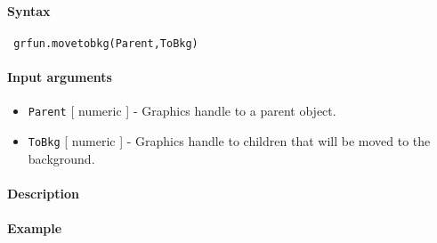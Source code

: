 


	\paragraph{Syntax}
 
 \begin{verbatim}
 grfun.movetobkg(Parent,ToBkg)
 \end{verbatim}
 
 \paragraph{Input arguments}
 
 \begin{itemize}
 \item
   \texttt{Parent} {[} numeric {]} - Graphics handle to a parent object.
 \item
   \texttt{ToBkg} {[} numeric {]} - Graphics handle to children that will
   be moved to the background.
 \end{itemize}
 
 \paragraph{Description}
 
 \paragraph{Example}


